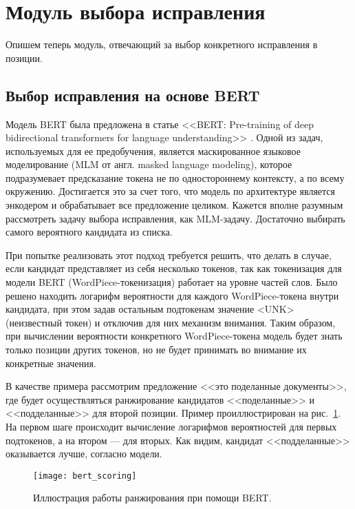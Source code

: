 \section{Модуль выбора исправления}

Опишем теперь модуль, отвечающий за выбор конкретного исправления в позиции.

\subsection{Выбор исправления на основе BERT}

Модель BERT была предложена в статье <<BERT: Pre-training of deep bidirectional transformers for language understanding>> \cite{Devlin2019}. Одной из задач, используемых для ее предобучения, является маскированное языковое моделирование (MLM от англ. masked language modeling), которое подразумевает предсказание токена не по одностороннему контексту, а по всему окружению. Достигается это за счет того, что модель по архитектуре является энкодером и обрабатывает все предложение целиком. Кажется вполне разумным рассмотреть задачу выбора исправления, как MLM-задачу. Достаточно выбирать самого вероятного кандидата из списка.

При попытке реализовать этот подход требуется решить, что делать в случае, если кандидат представляет из себя несколько токенов, так как токенизация для модели BERT (WordPiece-токенизация) работает на уровне частей слов. Было решено находить логарифм вероятности для каждого WordPiece-токена внутри кандидата, при этом задав остальным подтокенам значение <UNK> (неизвестный токен) и отключив для них механизм внимания. Таким образом, при вычислении вероятности конкретного WordPiece-токена модель будет знать только позиции других токенов, но не будет принимать во внимание их конкретные значения. 

В качестве примера рассмотрим предложение <<это поделанные документы>>, где будет осуществляться ранжирование кандидатов <<поделанные>> и <<подделанные>> для второй позиции. Пример проиллюстрирован на рис.~\ref{ris:bert_scoring}. На первом шаге происходит вычисление логарифмов вероятностей для первых подтокенов, а на втором --- для вторых. Как видим, кандидат <<подделанные>> оказывается лучше, согласно модели.

\begin{center}
	\begin{figure}[h!]
		\texttt{[image: bert\_scoring]}
		\caption{Иллюстрация работы ранжирования при помощи BERT.}
		\label{ris:bert_scoring}
	\end{figure}
\end{center}

